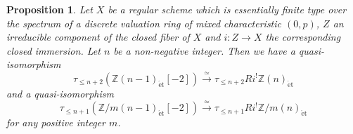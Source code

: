 \documentclass{article}
\newtheorem{prop}[thm]{\indent \sc Proposition}
\newcommand{\et}{\mathrm{\acute{e}t}}
\begin{document}
%
\begin{prop}\upshape\label{cset}
Let $X$ be a regular scheme which is essentially
finite type over the spectrum of a discrete
valuation ring of mixed characteristic $(0, p)$, 
$Z$ an irreducible component of the closed fiber of $X$
and
$i: Z\to X$ the corresponding closed immersion.
Let $n$ be a non-negative integer.
Then we have a quasi-isomorphism
%
\begin{equation}\label{qiss}
\tau_{\leq n+2}\left(
\mathbb{Z}(n-1)_{\et}[-2]
\right)
\xrightarrow{\simeq}
\tau_{\leq n+2}Ri^{!}\mathbb{Z}(n)_{\et}
\end{equation}
%
and a quasi-isomorphism
%
\begin{equation*}
\tau_{\leq n+1}\left(
\mathbb{Z}/m(n-1)_{\et}[-2]
\right)
\xrightarrow{\simeq}
\tau_{\leq n+1}Ri^{!}\mathbb{Z}/m(n)_{\et}
\end{equation*}
%
for any positive integer $m$.
\end{prop}
%
\end{document}
